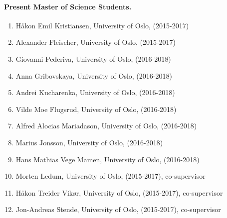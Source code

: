 \documentclass[a4wide,10pt]{article}
\begin{document}
\paragraph{Present Master of Science Students.}
\begin{enumerate}
\item Håkon Emil Kristiansen, University of Oslo, (2015-2017)

\item Alexander Fleischer, University of Oslo, (2015-2017)

\item Giovanni Pederiva, University of Oslo, (2016-2018)

\item Anna Gribovskaya, University of Oslo, (2016-2018)

\item Andrei Kucharenka, University of Oslo, (2016-2018)

\item Vilde Moe Flugsrud, University of Oslo, (2016-2018)

\item Alfred Alocias Mariadason, University of Oslo, (2016-2018)

\item Marius Jonsson, University of Oslo, (2016-2018)

\item Hans Mathias Vege Mamen, University of Oslo, (2016-2018)

\item Morten Ledum, University of Oslo, (2015-2017), co-supervisor

\item Håkon Treider Vikør, University of Oslo, (2015-2017), co-supervisor

\item Jon-Andreas Stende, University of Oslo, (2015-2017), co-supervisor
\end{enumerate}

\end{document}
